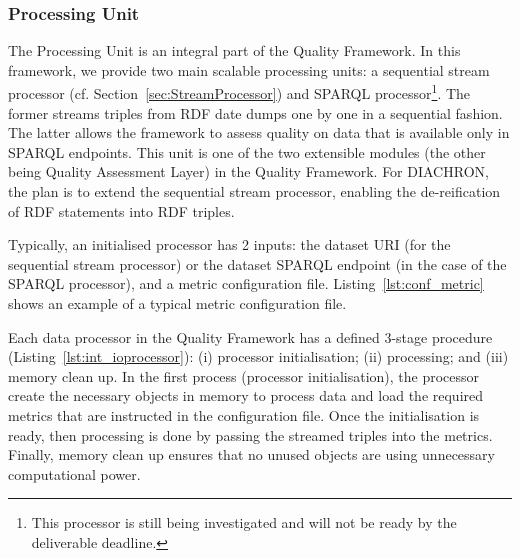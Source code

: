 \subsubsection{Processing Unit}
The Processing Unit is an integral part of the Quality Framework.
In this framework, we provide two main scalable processing units: a sequential stream processor (cf. Section~\ref{sec:StreamProcessor}) and SPARQL processor\footnote{This processor is still being investigated and will not be ready by the deliverable deadline.}.
The former streams triples from RDF date dumps one by one in a sequential fashion.
The latter allows the framework to assess quality on data that is available only in SPARQL endpoints. 
This unit is one of the two extensible modules (the other being Quality Assessment Layer) in the Quality Framework.
For DIACHRON, the plan is to extend the sequential stream processor, enabling the de-reification of RDF statements into RDF triples.

Typically, an initialised processor has 2 inputs: the dataset URI (for the sequential stream processor) or the dataset SPARQL endpoint (in the case of the SPARQL processor), and a metric configuration file.
Listing~\ref{lst:conf_metric} shows an example of a typical metric configuration file.
 
Each data processor in the Quality Framework has a defined 3-stage procedure (Listing~\ref{lst:int_ioprocessor}): (i) processor initialisation; (ii) processing; and (iii) memory clean up.
In the first process (processor initialisation), the processor create the necessary objects in memory to process data and load the required metrics that are instructed in the configuration file.
Once the initialisation is ready, then processing is done by passing the streamed triples into the metrics.
Finally, memory clean up ensures that no unused objects are using unnecessary computational power.
 

